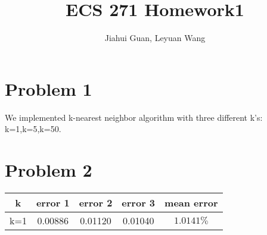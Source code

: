 \documentclass{article}
\title{ECS 271 Homework1}
\date{\vspace{-5ex}}
\begin{document}
\author{Jiahui Guan, Leyuan Wang}
\maketitle


\section{Problem 1} 
We implemented k-nearest neighbor algorithm with three different k's: k=1,k=5,k=50.\\


\section{Problem 2}
\begin{table}[H]
	\centering
	\begin{tabular}{c|c|c|c|c}
		\hline
		k&error 1 &error 2 &error 3&mean error\\
		\hline
		k=1&0.00886 &0.01120& 0.01040&$ 1.0141\%$\\
		\hline
		\hline
	\end{tabular}
\end{table}
 
 
\end{document}
